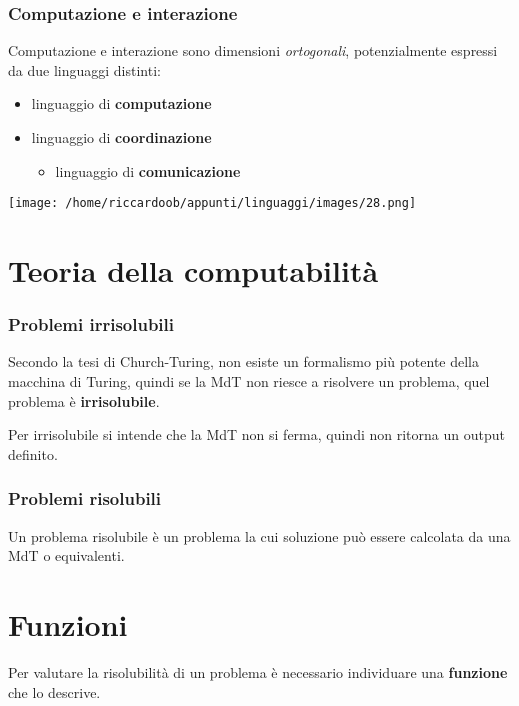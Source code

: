 \subsubsection{Computazione e interazione}
Computazione e interazione sono dimensioni \textit{ortogonali}, potenzialmente espressi da due linguaggi distinti:
\begin{multicols}{2} 
    \begin{itemize}
        \item linguaggio di \textbf{computazione}
        \item linguaggio di \textbf{coordinazione}
        \begin{itemize}
            \item linguaggio di \textbf{comunicazione}
        \end{itemize}
    \end{itemize}
    \begin{mdframed}[topline=false,bottomline=false,rightline=false]
        \begin{multicolfigure}
            \centering
            \texttt{[image: /home/riccardoob/appunti/linguaggi/images/28.png]}
        \end{multicolfigure}
    \end{mdframed}
\end{multicols}

\section{Teoria della computabilità}

\subsubsection{Problemi irrisolubili}
Secondo la tesi di Church-Turing, non esiste un formalismo più potente della macchina di Turing, quindi se la MdT non riesce a risolvere un problema, quel problema è \textbf{irrisolubile}.

Per irrisolubile si intende che la MdT non si ferma, quindi non ritorna un output definito.

\subsubsection{Problemi risolubili}
Un problema risolubile è un problema la cui soluzione può essere calcolata da una MdT o equivalenti.

\section{Funzioni}
Per valutare la risolubilità di un problema è necessario individuare una \textbf{funzione} che lo descrive.

